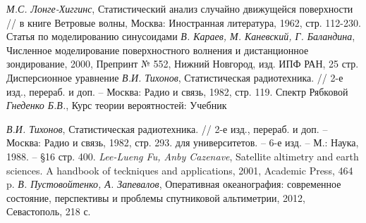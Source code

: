 \documentclass[a4paper,14pt]{extarticle}
\begin{document}
\begin{thebibliography}{}
     \textit{М.С. Лонге-Хиггинс}, Статистический анализ случайно
    движущейся поверхности // в книге Ветровые волны, Москва: Иностранная
    литература, 1962, стр. 112-230.
     Статья по моделированию синусоидами 
     \textit{В. Караев, М. Каневский, Г. Баландина}, Численное
    моделирование поверхностного волнения и дистанционное зондирование, 2000,
    Препринт № 552, Нижний Новгород, изд. ИПФ РАН, 25 стр. 
     Дисперсионное уравнение
     \textit{В.И. Тихонов}, Статистическая радиотехника. // 2-е
    изд., перераб. и доп. -- Москва: Радио и связь, 1982, стр. 119.
     Спектр Рябковой
     \textit{Гнеденко Б.В.}, Курс теории вероятностей: Учебник

     \textit{В.И. Тихонов}, Статистическая радиотехника. // 2-е
    изд., перераб. и доп. -- Москва: Радио и связь, 1982, стр. 293.
    для университетов. -- 6-е изд.  -- М.: Наука, 1988. -- \S 16 
    стр. 400.
     \textit{Lee-Lueng Fu, Anby Cazenave}, Satellite altimetry
    and earth sciences. A handbook of teckniques and applications, 2001,
    Academic Press, 464 p.
     \textit{В. Пустовойтенко, А. Запевалов}, Оперативная
    океанография: современное состояние, перспективы и проблемы спутниковой
    альтиметрии, 2012, Севастополь, 218 с.
    \end{thebibliography}
\end{document}

